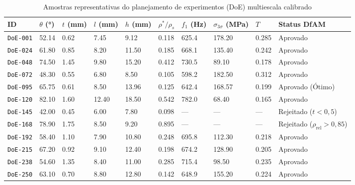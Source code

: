 \begin{apendicesenv}
\begin{table}[htb]
  \caption{Amostras representativas do planejamento de experimentos (DoE) multiescala calibrado}
  \label{tab:doe-250-amostras}
  \scriptsize
  \SingleSpacing
  \begin{tabularx}{\textwidth}{@{}>{\raggedright\arraybackslash}p{1.4cm} *{8}{>{\centering\arraybackslash}X} >{\centering\arraybackslash}p{1.6cm}@{}}
    \toprule
    \textbf{ID} & $\theta$ (\si{\degree}) & $t$ (\si{\milli\metre}) & $l$ (\si{\milli\metre}) & $h$ (\si{\milli\metre}) & $\rho^{*}/\rho_s$ & $f_1$ (\si{\hertz}) & $\sigma_{3\sigma}$ (\si{\mega\pascal}) & $T$ & \textbf{Status DfAM} \\
    \midrule
    \texttt{DoE-001} & \num{52.14} & \num{0.62} & \num{7.45}  & \num{9.12}  & \num{0.118} & \num{625.4} & \num{178.20} & \num{0.285} & Aprovado \\
    \texttt{DoE-024} & \num{61.80} & \num{0.85} & \num{8.20}  & \num{11.50} & \num{0.185} & \num{668.1} & \num{135.40} & \num{0.242} & Aprovado \\
    \texttt{DoE-048} & \num{74.50} & \num{1.45} & \num{9.80}  & \num{15.20} & \num{0.412} & \num{730.5} & \num{89.10}  & \num{0.178} & Aprovado \\
    \texttt{DoE-072} & \num{48.30} & \num{0.55} & \num{6.80}  & \num{8.50}  & \num{0.105} & \num{598.2} & \num{182.50} & \num{0.312} & Aprovado \\
    \texttt{DoE-095} & \num{65.75} & \num{0.61} & \num{8.50}  & \num{13.96} & \num{0.125} & \num{642.4} & \num{168.57} & \num{0.199} & Aprovado (Ótimo) \\
    \texttt{DoE-120} & \num{82.10} & \num{1.60} & \num{12.40} & \num{18.50} & \num{0.542} & \num{782.0} & \num{68.40}  & \num{0.165} & Aprovado \\
    \texttt{DoE-145} & \num{42.00} & \num{0.45} & \num{6.00}  & \num{7.80}  & \num{0.098} & ---         & ---          & ---         & Rejeitado ($t < 0{,}5$) \\
    \texttt{DoE-168} & \num{78.90} & \num{1.75} & \num{8.50}  & \num{9.20}  & \num{0.895} & ---         & ---          & ---         & Rejeitado ($\rho_{\text{rel}} > 0{,}85$) \\
    \texttt{DoE-192} & \num{58.40} & \num{1.10} & \num{7.90}  & \num{10.80} & \num{0.248} & \num{695.8} & \num{112.30} & \num{0.218} & Aprovado \\
    \texttt{DoE-215} & \num{67.20} & \num{0.92} & \num{9.10}  & \num{12.40} & \num{0.198} & \num{674.2} & \num{128.90} & \num{0.205} & Aprovado \\
    \texttt{DoE-238} & \num{54.60} & \num{1.35} & \num{8.40}  & \num{11.00} & \num{0.285} & \num{715.4} & \num{98.50}  & \num{0.235} & Aprovado \\
    \texttt{DoE-250} & \num{63.10} & \num{0.70} & \num{8.80}  & \num{12.80} & \num{0.142} & \num{648.9} & \num{155.20} & \num{0.224} & Aprovado \\
    \bottomrule
  \end{tabularx}
\end{table}


\end{apendicesenv}
